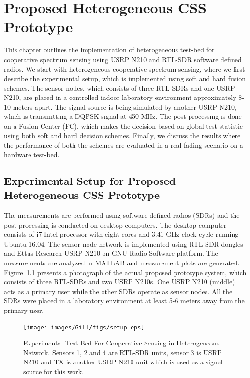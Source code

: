 \chapter{Proposed Heterogeneous CSS Prototype}
\label{chapter5}

This chapter outlines the implementation of heterogeneous test-bed for cooperative spectrum sensing using USRP N210 and RTL-SDR software defined radios. We start with heterogeneous cooperative spectrum sensing, where we first describe the experimental setup, which is implemented using soft and hard fusion schemes. The sensor nodes, which consists of three RTL-SDRs and one USRP N210, are placed in a controlled indoor laboratory environment approximately 8-10 meters apart. The signal source is being simulated by another USRP N210, which is transmitting a DQPSK signal at 450 MHz. The post-processing is done on a Fusion Center (FC), which makes the decision based on global test statistic using both soft and hard decision schemes. Finally, we discuss the results where the performance of both the schemes are evaluated in a real fading scenario on a hardware test-bed. 

\section{Experimental Setup for Proposed Heterogeneous CSS Prototype}

The measurements are performed using software-defined radios (SDRs) and the post-processing is conducted on desktop computers. The desktop computer consists of i7 Intel processor with eight cores and 3.41 GHz clock cycle running Ubuntu 16.04. The sensor node network is implemented using RTL-SDR dongles and Ettus Research USRP N210 on GNU Radio Software platform. The measurements are analyzed in MATLAB and measurement plots are generated. Figure~\ref{expsetup} presents a photograph of the actual proposed prototype system, which consists of three RTL-SDRs and two USRP N210s. One USRP N210 (middle) acts as a primary user while the other SDRs operate as sensor nodes. All the SDRs were placed in a laboratory environment at least 5-6 meters away from the primary user.

\begin{figure}
\centering
	\texttt{[image: images/Gill/figs/setup.eps]} 
\caption{Experimental Test-Bed For Cooperative Sensing in Heterogeneous Network. Sensors 1, 2 and 4 are RTL-SDR units, sensor 3 is USRP N210 and TX is another USRP N210 unit which is used as a signal source for this work.}
\label{expsetup}
\end{figure}

